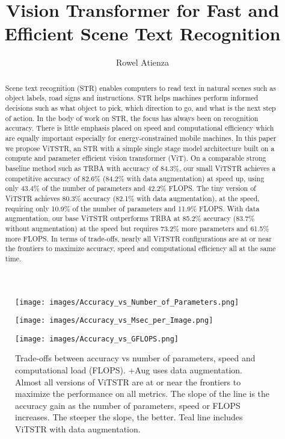 \documentclass[runningheads]{llncs}
\begin{document}
\title{Vision Transformer for Fast and Efficient Scene Text Recognition}
\author{Rowel Atienza }  \maketitle              \begin{abstract}
Scene text recognition (STR) enables computers to read text in natural scenes such as object labels, road signs and instructions. STR helps machines perform informed decisions such as what object to pick, which direction to go, and what is the next step of action. In the body of work on STR, the focus has always been on recognition accuracy. There is little emphasis placed on speed and computational efficiency which are equally important especially for energy-constrained mobile machines. In this paper we propose ViTSTR, an STR with a simple single stage model architecture built on a compute and parameter efficient vision transformer (ViT). On a comparable strong baseline method such as TRBA with accuracy of 84.3\%, our small ViTSTR achieves a competitive accuracy of 82.6\% (84.2\% with data augmentation) at  speed up, using only 43.4\% of the number of parameters and 42.2\% FLOPS. The tiny version of ViTSTR achieves 80.3\% accuracy (82.1\% with data augmentation), at  the speed, requiring only 10.9\% of the number of parameters and 11.9\% FLOPS. With data augmentation, our base ViTSTR outperforms TRBA at 85.2\% accuracy (83.7\% without augmentation) at  the speed but requires 73.2\% more parameters and 61.5\% more FLOPS.  In terms of trade-offs, nearly all ViTSTR configurations are at or near the frontiers to maximize accuracy, speed and computational efficiency all at the same time. 

\end{abstract}


\begin{figure}
\centering

    \texttt{[image: images/Accuracy\_vs\_Number\_of\_Parameters.png]}
        
    \texttt{[image: images/Accuracy\_vs\_Msec\_per\_Image.png]}
    
    \texttt{[image: images/Accuracy\_vs\_GFLOPS.png]}
 \caption{Trade-offs between accuracy vs number of parameters, speed and computational load (FLOPS). +Aug uses data augmentation. Almost all versions of ViTSTR are at or near the frontiers to maximize the performance on all metrics. The slope of the line is the accuracy gain as the number of parameters, speed or FLOPS increases. The steeper the slope, the better. Teal line includes ViTSTR with data augmentation.}
\label{fig:acc_vs_perf}
\end{figure}
\end{document}
